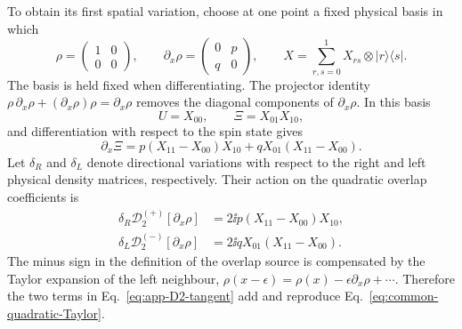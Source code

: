To obtain its first spatial variation, choose at one point a fixed physical
basis in which
\begin{equation}
\rho=\begin{pmatrix}1&0\\0&0\end{pmatrix},
\qquad
\partial_x\rho=\begin{pmatrix}0&p\\q&0\end{pmatrix},
\qquad
X=\sum_{r,s=0}^1X_{rs}\otimes|r\rangle\langle s|.
\label{eq:app-rho-block-basis}
\end{equation}
The basis is held fixed when differentiating.  The projector identity
$\rho\,\partial_x\rho+(\partial_x\rho)\rho=\partial_x\rho$ removes the
diagonal components of $\partial_x\rho$.  In this basis
\begin{equation}
U=X_{00},
\qquad
\Xi=X_{01}X_{10},
\label{eq:app-U-Xi-blocks}
\end{equation}
and differentiation with respect to the spin state gives
\begin{equation}
\partial_x\Xi
=p(X_{11}-X_{00})X_{10}
+qX_{01}(X_{11}-X_{00}).
\label{eq:app-Xi-tangent}
\end{equation}
Let $\delta_R$ and $\delta_L$ denote directional variations with respect to
the right and left physical density matrices, respectively.  Their action on
the quadratic overlap coefficients is
\begin{align}
\delta_R\mathcal D^{(+)}_2[\partial_x\rho]
&=2\ii p(X_{11}-X_{00})X_{10},
\nonumber\\
\delta_L\mathcal D^{(-)}_2[\partial_x\rho]
&=2\ii qX_{01}(X_{11}-X_{00}).
\label{eq:app-D2-tangent}
\end{align}
The minus sign in the definition of the overlap source is compensated by the
Taylor expansion of the left neighbour,
$\rho(x-\epsilon)=\rho(x)-\epsilon\partial_x\rho+\cdots$.  Therefore the two
terms in Eq.~\eqref{eq:app-D2-tangent} add and reproduce
Eq.~\eqref{eq:common-quadratic-Taylor}.

